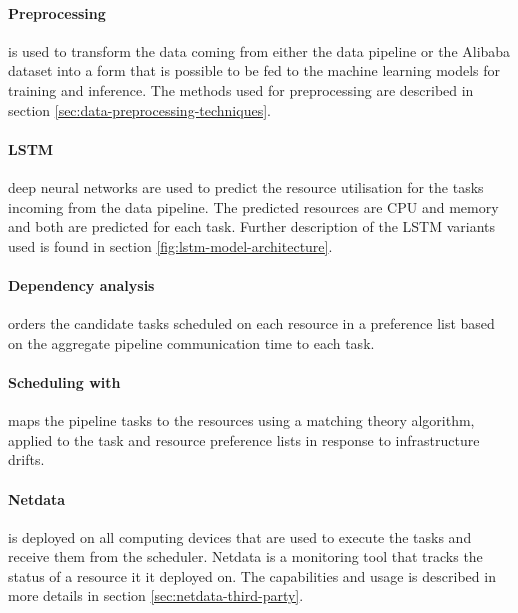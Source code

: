       \paragraph{Preprocessing} is used to transform the data coming from either the data pipeline or the Alibaba dataset into a form that is possible to be fed to the machine learning models for training and inference. The methods used for preprocessing are described in section \ref{sec:data-preprocessing-techniques}.

      \paragraph{LSTM} deep neural networks are used to predict the resource utilisation for the tasks incoming from the data pipeline.
      The predicted resources are CPU and memory and both are predicted for each task. 
      Further description of the LSTM variants used is found in section \ref{fig:lstm-model-architecture}.

      \paragraph{Dependency analysis} orders the candidate tasks scheduled on each resource in a preference list based on the aggregate pipeline communication time to each task.
      
      \paragraph{Scheduling with \CMATCH} maps the pipeline tasks to the resources using a matching theory algorithm, applied to the task and resource preference lists in response to infrastructure drifts.
    
    
      
      \paragraph{Netdata} is deployed on all computing devices that are used to execute the tasks and receive them from the \CMATCH scheduler. Netdata is a monitoring tool that tracks the status of a resource it it deployed on.
      The capabilities and usage is described in more details in section \ref{sec:netdata-third-party}.

